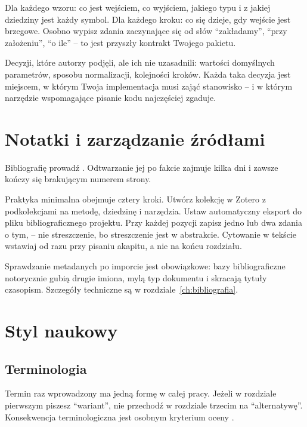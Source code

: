  Dla każdego wzoru: co jest wejściem, co wyjściem, jakiego typu i z jakiej dziedziny jest każdy symbol. Dla każdego kroku: co się dzieje, gdy wejście jest brzegowe. Osobno wypisz zdania zaczynające się od słów \enquote{zakładamy}, \enquote{przy założeniu}, \enquote{o ile} -- to jest przyszły kontrakt Twojego pakietu.

 Decyzji, które autorzy podjęli, ale ich nie uzasadnili: wartości domyślnych parametrów, sposobu normalizacji, kolejności kroków. Każda taka decyzja jest miejscem, w którym Twoja implementacja musi zająć stanowisko -- i w którym narzędzie wspomagające pisanie kodu najczęściej zgaduje.

\section{Notatki i zarządzanie źródłami}

Bibliografię prowadź . Odtwarzanie jej po fakcie zajmuje kilka dni i zawsze kończy się brakującym numerem strony.

Praktyka minimalna obejmuje cztery kroki. Utwórz kolekcję w Zotero z podkolekcjami na metodę, dziedzinę i narzędzia. Ustaw automatyczny eksport do pliku bibliograficznego projektu. Przy każdej pozycji zapisz jedno lub dwa zdania o tym,  -- nie streszczenie, bo streszczenie jest w abstrakcie. Cytowanie w tekście wstawiaj od razu przy pisaniu akapitu, a nie na końcu rozdziału.

Sprawdzanie metadanych po imporcie jest obowiązkowe: bazy bibliograficzne notorycznie gubią drugie imiona, mylą typ dokumentu i skracają tytuły czasopism. Szczegóły techniczne są w rozdziale~\ref{ch:bibliografia}.

\section{Styl naukowy}

\subsection{Terminologia}

Termin raz wprowadzony ma jedną formę w całej pracy. Jeżeli w rozdziale pierwszym piszesz \enquote{wariant}, nie przechodź w rozdziale trzecim na \enquote{alternatywę}. Konsekwencja terminologiczna jest osobnym kryterium oceny \parencite{standardyEPI}.

